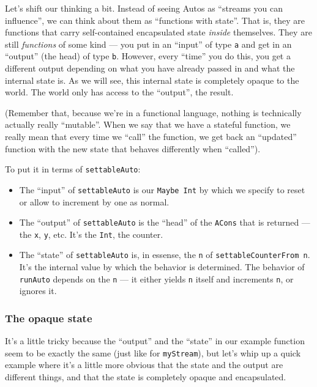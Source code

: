 \documentclass[]{article}
\begin{document}
Let's shift our thinking a bit. Instead of seeing Autos as ``streams you can influence'', we can
think about them as ``functions with state''. That is, they are functions that carry self-contained
encapsulated state \emph{inside} themselves. They are still \emph{functions} of some kind --- you
put in an ``input'' of type \texttt{a} and get in an ``output'' (the head) of type \texttt{b}.
However, every ``time'' you do this, you get a different output depending on what you have already
passed in and what the internal state is. As we will see, this internal state is completely opaque
to the world. The world only has access to the ``output'', the result.

(Remember that, because we're in a functional language, nothing is technically actually really
``mutable''. When we say that we have a stateful function, we really mean that every time we
``call'' the function, we get back an ``updated'' function with the new state that behaves
differently when ``called'').

To put it in terms of \texttt{settableAuto}:

\begin{itemize}
\tightlist
\item
  The ``input'' of \texttt{settableAuto} is our \texttt{Maybe\ Int} by which we specify to reset or
  allow to increment by one as normal.
\item
  The ``output'' of \texttt{settableAuto} is the ``head'' of the \texttt{ACons} that is returned ---
  the \texttt{x}, \texttt{y}, etc. It's the \texttt{Int}, the counter.
\item
  The ``state'' of \texttt{settableAuto} is, in essense, the \texttt{n} of
  \texttt{settableCounterFrom\ n}. It's the internal value by which the behavior is determined. The
  behavior of \texttt{runAuto} depends on the \texttt{n} --- it either yields \texttt{n} itself and
  increments \texttt{n}, or ignores it.
\end{itemize}

\subsubsection{The opaque state}\label{the-opaque-state}

It's a little tricky because the ``output'' and the ``state'' in our example function seem to be
exactly the same (just like for \texttt{myStream}), but let's whip up a quick example where it's a
little more obvious that the state and the output are different things, and that the state is
completely opaque and encapsulated.
\end{document}
